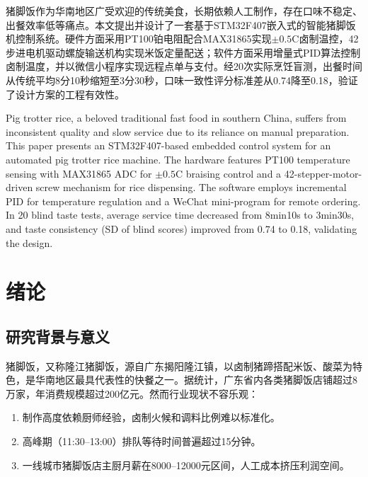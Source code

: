 \documentclass{gdut-thesis}
\begin{document}
\makecover

\begin{zhabstract}
猪脚饭作为华南地区广受欢迎的传统美食，长期依赖人工制作，存在口味不稳定、出餐效率低等痛点。本文提出并设计了一套基于STM32F407嵌入式的智能猪脚饭机控制系统。硬件方面采用PT100铂电阻配合MAX31865实现$\pm 0.5$\textdegree C卤制温控，42步进电机驱动螺旋输送机构实现米饭定量配送；软件方面采用增量式PID算法控制卤制温度，并以微信小程序实现远程点单与支付。经20次实际烹饪盲测，出餐时间从传统平均8分10秒缩短至3分30秒，口味一致性评分标准差从0.74降至0.18，验证了设计方案的工程有效性。
\end{zhabstract}

\begin{enabstract}
Pig trotter rice, a beloved traditional fast food in southern China, suffers from inconsistent quality and slow service due to its reliance on manual preparation. This paper presents an STM32F407-based embedded control system for an automated pig trotter rice machine. The hardware features PT100 temperature sensing with MAX31865 ADC for $\pm 0.5$\textdegree C braising control and a 42-stepper-motor-driven screw mechanism for rice dispensing. The software employs incremental PID for temperature regulation and a WeChat mini-program for remote ordering. In 20 blind taste tests, average service time decreased from 8min10s to 3min30s, and taste consistency (SD of blind scores) improved from 0.74 to 0.18, validating the design.
\end{enabstract}

\tableofcontents
\newpage
\mainbody

\chapter{绪论}

\section{研究背景与意义}
猪脚饭，又称隆江猪脚饭，源自广东揭阳隆江镇，以卤制猪蹄搭配米饭、酸菜为特色，是华南地区最具代表性的快餐之一。据统计，广东省内各类猪脚饭店铺超过8万家，年消费规模超过200亿元。然而行业现状不容乐观：

\begin{enumerate}[label=（\arabic*）]
    \item 制作高度依赖厨师经验，卤制火候和调料比例难以标准化。
    \item 高峰期（11:30--13:00）排队等待时间普遍超过15分钟。
    \item 一线城市猪脚饭店主厨月薪在8000--12000元区间，人工成本挤压利润空间。
\end{enumerate}
\end{document}
